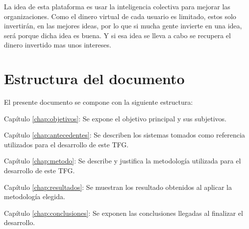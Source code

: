  La idea de esta plataforma es usar la inteligencia colectiva para mejorar las organizaciones. Como el dinero virtual de cada usuario es limitado, estos
  solo invertirán,  en las mejores ideas, por lo que si mucha gente invierte en una idea, será porque dicha idea es buena. Y si esa idea se lleva a cabo 
  se recupera el dinero invertido  mas unos intereses.
 
\section{Estructura del documento}

El presente documento se compone con la siguiente estructura:

\begin{definitionlist}
\item[Capítulo \ref{chap:objetivos}: \nameref{chap:objetivos}] Se expone el objetivo principal y sus subjetivos.
 \item[Capítulo \ref{chap:antecedentes}: \nameref{chap:antecedentes}] Se describen los sistemas tomados como referencia utilizados para 
 el desarrollo de este \acs{TFG}.
  \item [Capítulo \ref{chap:metodo}: \nameref{chap:metodo}] Se describe y justifica la metodología utilizada para el desarrollo de este \acs{TFG}.
  \item[Capítulo \ref{chap:resultados}: \nameref{chap:resultados}] Se muestran los resultado obtenidos al aplicar la metodología elegida.
  \item[Capítulo \ref{chap:conclusiones}: \nameref{chap:conclusiones}] Se exponen las conclusiones llegadas al finalizar el desarrollo.
\end{definitionlist}

